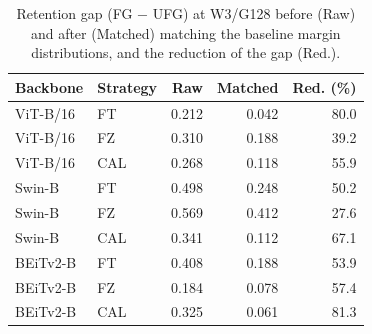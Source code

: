 \begin{table}[t]
\centering
\caption{Retention gap (FG $-$ UFG) at W3/G128 before (Raw) and after (Matched) matching the baseline margin distributions, and the reduction of the gap (Red.).}
\label{tab:marginShort}
\setlength{\tabcolsep}{3pt}
\small
\begin{tabular}{llrrr}
\toprule
Backbone & Strategy & Raw & Matched & Red. (\%) \\
\midrule
ViT-B/16 & FT & 0.212 & 0.042 & 80.0 \\
ViT-B/16 & FZ & 0.310 & 0.188 & 39.2 \\
ViT-B/16 & CAL & 0.268 & 0.118 & 55.9 \\
Swin-B & FT & 0.498 & 0.248 & 50.2 \\
Swin-B & FZ & 0.569 & 0.412 & 27.6 \\
Swin-B & CAL & 0.341 & 0.112 & 67.1 \\
BEiTv2-B & FT & 0.408 & 0.188 & 53.9 \\
BEiTv2-B & FZ & 0.184 & 0.078 & 57.4 \\
BEiTv2-B & CAL & 0.325 & 0.061 & 81.3 \\
\bottomrule
\end{tabular}
\end{table}
